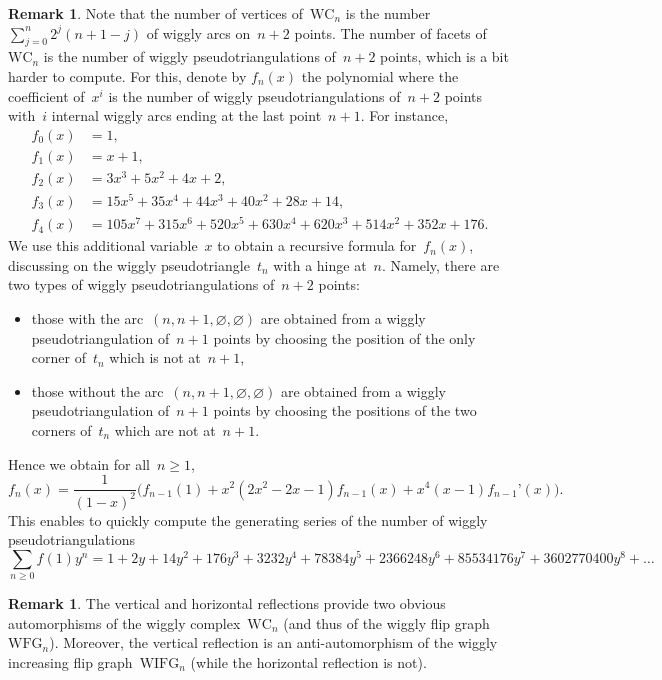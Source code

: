 \documentclass{amsart}
\theoremstyle{definition}
\newtheorem{remark}[theorem]{Remark}
\newcommand{\wigglyComplex}{\mathrm{WC}} %
\newcommand{\wigglyFlipGraph}{\mathrm{WFG}} %
\newcommand{\wigglyIncreasingFlipGraph}{\mathrm{WIFG}} %
\begin{document}
\begin{remark}
Note that the number of vertices of~$\wigglyComplex_n$ is the number~$\sum_{j = 0}^n 2^j (n+1-j)$ of wiggly arcs on~$n+2$ points.
The number of facets of~$\wigglyComplex_n$ is the number of wiggly pseudotriangulations of~$n+2$ points, which is a bit harder to compute.
For this, denote by $f_n(x)$ the polynomial where the coefficient of~$x^i$ is the number of wiggly pseudotriangulations of~$n+2$ points with~$i$ internal wiggly arcs ending at the last point~$n+1$.
For instance,
\begin{align*}
	f_0(x) & = 1, \\
	f_1(x) & = x + 1, \\
	f_2(x) & = 3 x^3 + 5 x^2 + 4 x + 2, \\
	f_3(x) & = 15 x^5 + 35 x^4 + 44 x^3 + 40 x^2 + 28 x + 14, \\
	f_4(x) & = 105 x^7 + 315 x^6 + 520 x^5 + 630 x^4 + 620 x^3 + 514 x^2 + 352 x + 176.
\end{align*}
We use this additional variable~$x$ to obtain a recursive formula for~$f_n(x)$, discussing on the wiggly pseudotriangle~$t_n$ with a hinge at~$n$.
Namely, there are two types of wiggly pseudotriangulations of~$n+2$ points:
\begin{itemize}
\item those with the arc~$(n, n+1, \varnothing, \varnothing)$ are obtained from a wiggly pseudotriangulation of~$n+1$ points by choosing the position of the only corner of~$t_n$ which is not at~$n+1$,
\item those without the arc~$(n, n+1, \varnothing, \varnothing)$ are obtained from a wiggly pseudotriangulation of~$n+1$ points by choosing the positions of the two corners of~$t_n$ which are not at~$n+1$.
\end{itemize}
Hence we obtain for all~$n \ge 1$,
\[
f_{n}(x) = \frac{1}{(1 - x)^2} \big( f_{n-1}(1) + x^2 (2 x^2 - 2 x - 1) f_{n-1}(x) + x^4 (x - 1) f_{n-1}’(x) \big).
\]
This enables to quickly compute the generating series of the number of wiggly pseudotriangulations
\[
\sum_{n \ge 0} f(1) y^n = 1 + 2 y + 14 y^2 + 176 y^3 + 3232 y^4 + 78384 y^5 + 2366248 y^6 + 85534176 y^7 + 3602770400 y^8 + 
\dots
\]
\end{remark}

\begin{remark}
\label{rem:wigglyComplexAutomorphism}
The vertical and horizontal reflections provide two obvious automorphisms of the wiggly complex~$\wigglyComplex_n$ (and thus of the wiggly flip graph~$\wigglyFlipGraph_n$).
Moreover, the vertical reflection is an anti-automorphism of the wiggly increasing flip graph~$\wigglyIncreasingFlipGraph_n$ (while the horizontal reflection is not).
\end{remark}
\end{document}
